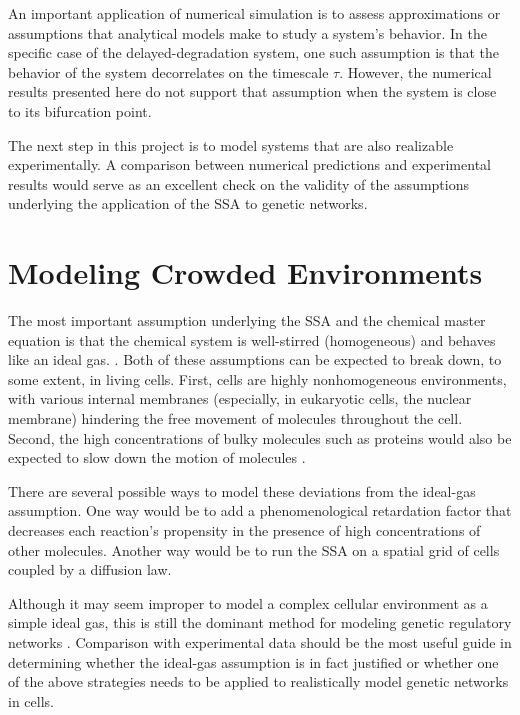 \documentclass[english,letterpaper,12pt]{report}
\begin{document}
\begin{doublespacing}
An important application of numerical simulation is to assess approximations or assumptions that analytical models make to study a system's behavior. In the specific case of the delayed-degradation system, one such assumption is that the behavior of the system decorrelates on the timescale $\tau$. However, the numerical results presented here do not support that assumption when the system is close to its bifurcation point.

The next step in this project is to model systems that are also realizable experimentally. A comparison between numerical predictions and experimental results would serve as an excellent check on the validity of the assumptions underlying the application of the SSA to genetic networks.

\section{Modeling Crowded Environments} %
\label{sub:diffusion-crowded}

The most important assumption underlying the SSA and the chemical master equation is that the chemical system is well-stirred (homogeneous) and behaves like an ideal gas. . Both of these assumptions can be expected to break down, to some extent, in living cells. First, cells are highly nonhomogeneous environments, with various internal membranes (especially, in eukaryotic cells, the nuclear membrane) hindering the free movement of molecules throughout the cell. Second, the high concentrations of bulky molecules such as proteins would also be expected to slow down the motion of molecules .

There are several possible ways to model these deviations from the ideal-gas assumption. One way would be to add a phenomenological retardation factor that decreases each reaction's propensity in the presence of high concentrations of other molecules. Another way would be to run the SSA on a spatial grid of cells coupled by a diffusion law.

Although it may seem improper to model a complex cellular environment as a simple ideal gas, this is still the dominant method for modeling genetic regulatory networks . Comparison with experimental data should be the most useful guide in determining whether the ideal-gas assumption is in fact justified or whether one of the above strategies needs to be applied to realistically model genetic networks in cells.


\end{doublespacing}
\end{document}

